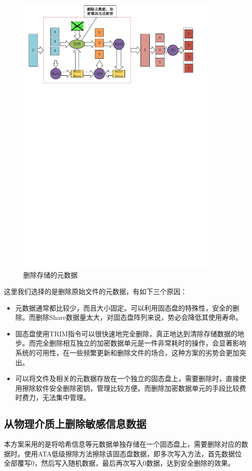 \begin{figure}[H]
	\centering
	\includegraphics[width=4in]{Pics/del-hashkey.pdf}
	\caption{删除存储的元数据}\label{fig:7}
\end{figure}


这里我们选择的是删除原始文件的元数据，有如下三个原因：
\begin{itemize}
	\item 元数据通常都比较少，而且大小固定。可以利用固态盘的特殊性，安全的删除。而删除Share数据量太大，对固态盘阵列来说，势必会降低其使用寿命。
	\item 固态盘使用TRIM指令可以很快速地完全删除，真正地达到清除存储数据的地步。而完全删除相互独立的加密数据单元是一件非常耗时的操作，会显著影响系统的可用性，在一些频繁更新和删除文件的场合，这种方案的劣势会更加突出。
	\item 可以将文件及相关的元数据存放在一个独立的固态盘上，需要删除时，直接使用擦除软件安全删除密钥，管理比较方便。而删除加密数据单元的手段比较费时费力，无法集中管理。
\end{itemize}

\subsection{从物理介质上删除敏感信息数据}
本方案采用的是将哈希信息等元数据单独存储在一个固态盘上，需要删除对应的数据时。使用ATA低级擦除方法擦除该固态盘数据，即多次写入方法，首先数据位全部覆写0，然后写入随机数据，最后再次写入0数据，达到安全删除的效果\cite{Lee2008Secure,Swanson2010Safe}。
